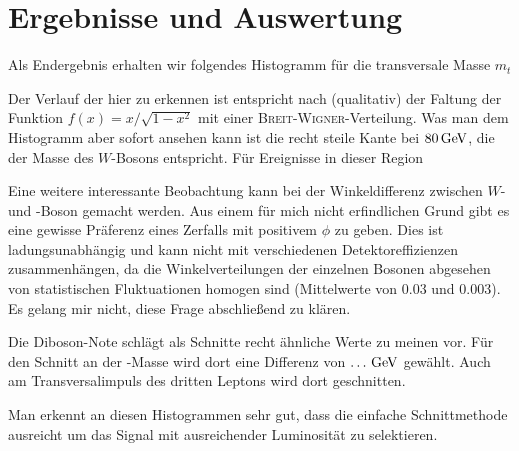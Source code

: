 \section{Ergebnisse und Auswertung}
Als Endergebnis erhalten wir folgendes Histogramm für die transversale Masse
$m_t$

\begin{center}
  
\end{center}

Der Verlauf der hier zu erkennen ist entspricht nach\cite{transv} (qualitativ)
der Faltung der Funktion $f(x) = x/\sqrt{1-x^2}$ mit einer
\textsc{Breit}-\textsc{Wigner}-Verteilung. Was man dem Histogramm aber sofort
ansehen kann ist die recht steile Kante bei $\unit[80]{GeV}$, die der Masse des
$W$-Bosons entspricht. Für Ereignisse in dieser Region 

Eine weitere interessante Beobachtung kann bei der Winkeldifferenz zwischen $W$-
und \Z-Boson gemacht werden. Aus einem für mich nicht erfindlichen Grund gibt es
eine gewisse Präferenz eines Zerfalls mit positivem $\phi$ zu geben. Dies ist
ladungsunabhängig und kann nicht mit verschiedenen Detektoreffizienzen
zusammenhängen, da die Winkelverteilungen der einzelnen Bosonen abgesehen von
statistischen Fluktuationen homogen sind (Mittelwerte von $0.03$ und $0.003$).
Es gelang mir nicht, diese Frage abschließend zu klären.

\begin{center}
  
\end{center}

Die Diboson-Note schlägt als Schnitte recht ähnliche Werte zu meinen vor. Für
den Schnitt an der \Z-Masse wird dort eine Differenz von $\unit[\dots]{GeV}$
gewählt. Auch am Transversalimpuls des dritten Leptons wird dort geschnitten.

Man erkennt an diesen Histogrammen sehr gut, dass die einfache Schnittmethode
ausreicht um das Signal mit ausreichender Luminosität zu selektieren.
